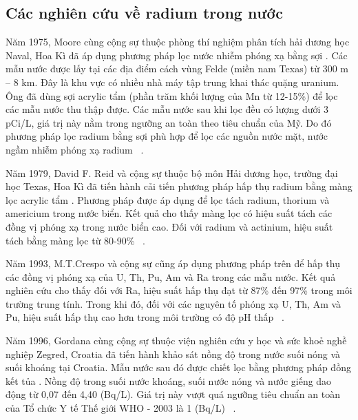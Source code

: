     \subsection{Các nghiên cứu về radium trong nước}

Năm 1975, Moore cùng cộng sự thuộc phòng thí nghiệm phân tích hải dương học Naval, Hoa Kì đã áp dụng phương pháp lọc nước nhiễm phóng xạ  bằng sợi . Các mẫu nước được lấy tại các địa điểm cách vùng Felde (miền nam Texas) từ 300 m – 8 km. Đây là khu vực có nhiều nhà máy tập trung khai thác quặng uranium. Ông đã dùng sợi acrylic tẩm  (phần trăm khối lượng của Mn từ 12-15\%) để lọc các mẫu nước thu thập được. Các mẫu nước sau khi lọc đều có lượng  dưới 3 pCi/L, giá trị này nằm trong ngưỡng an toàn theo tiêu chuẩn của Mỹ. Do đó phương pháp lọc radium bằng sợi  phù hợp để lọc các nguồn nước mặt, nước ngầm nhiễm phóng xạ radium ~\cite{MnO2:Moore}. 
    
Năm 1979, David F. Reid và cộng sự thuộc bộ môn Hải dương học, trường đại học Texas, Hoa Kì đã tiến hành cải tiến phương pháp hấp thụ radium bằng màng lọc acrylic tẩm . Phương pháp được áp dụng để lọc tách radium, thorium và americium trong nước biển. Kết quả cho thấy màng lọc có hiệu suất tách các đồng vị phóng xạ trong nước biển cao. Đối với radium và actinium, hiệu suất tách bằng màng lọc từ 80-90\% ~\cite{MnO2:DavidFReid}.

Năm 1993, M.T.Crespo và cộng sự cũng áp dụng phương pháp trên để hấp thụ các đồng vị phóng xạ của U, Th, Pu, Am và Ra trong các mẫu nước. Kết quả nghiên cứu cho thấy đối với Ra, hiệu suất hấp thụ đạt từ 87\% đến 97\% trong môi trường trung tính. Trong khi đó, đối với các nguyên tố phóng xạ U, Th, Am và Pu, hiệu suất hấp thụ cao hơn trong môi trường có độ pH thấp ~\cite{MnO2:M.T.Crespo}. 

Năm 1996, Gordana cùng cộng sự thuộc viện nghiên cứu y học và sức khoẻ nghề nghiệp Zegred, Croatia đã tiến hành khảo sát nồng độ  trong nước suối nóng và suối khoáng tại Croatia.  Mẫu nước sau đó được chiết lọc bằng phương pháp đồng kết tủa .  Nồng độ  trong suối nước khoáng, suối nước nóng và nước giếng dao động từ 0,07 đến 4,40 (Bq/L). Giá trị này vượt quá ngưỡng tiêu chuẩn an toàn của Tổ chức Y tế Thế giới WHO - 2003 là 1 (Bq/L) ~\cite{MnO2:GordanaMarovic}. 

